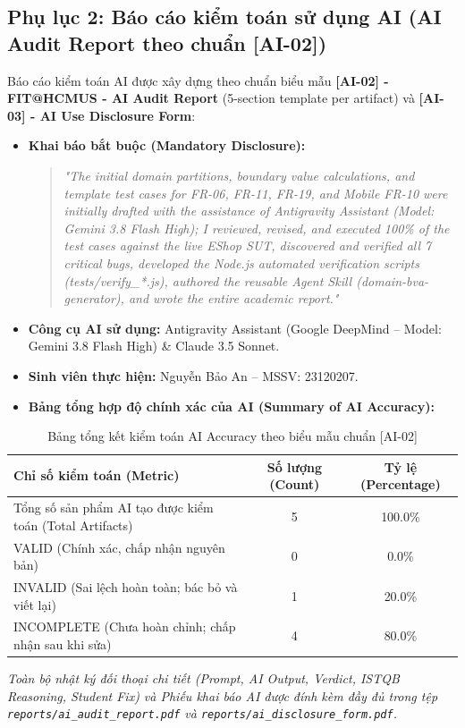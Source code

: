 \documentclass[11pt,a4paper]{article}
\begin{document}
\subsection{Phụ lục 2: Báo cáo kiểm toán sử dụng AI (AI Audit Report theo chuẩn [AI-02])}
Báo cáo kiểm toán AI được xây dựng theo chuẩn biểu mẫu \textbf{[AI-02] - FIT@HCMUS - AI Audit Report} (5-section template per artifact) và \textbf{[AI-03] - AI Use Disclosure Form}:

\begin{itemize}
    \item \textbf{Khai báo bắt buộc (Mandatory Disclosure):}
    \begin{quote}
    \textit{"The initial domain partitions, boundary value calculations, and template test cases for FR-06, FR-11, FR-19, and Mobile FR-10 were initially drafted with the assistance of Antigravity Assistant (Model: Gemini 3.8 Flash High); I reviewed, revised, and executed 100\% of the test cases against the live EShop SUT, discovered and verified all 7 critical bugs, developed the Node.js automated verification scripts (tests/verify\_*.js), authored the reusable Agent Skill (domain-bva-generator), and wrote the entire academic report."}
    \end{quote}
    \item \textbf{Công cụ AI sử dụng:} Antigravity Assistant (Google DeepMind -- Model: Gemini 3.8 Flash High) \& Claude 3.5 Sonnet.
    \item \textbf{Sinh viên thực hiện:} Nguyễn Bảo An -- MSSV: 23120207.
    \item \textbf{Bảng tổng hợp độ chính xác của AI (Summary of AI Accuracy):}
\end{itemize}

\begin{table}[h]
\centering
\small
\begin{tabularx}{0.85\textwidth}{X c c}
\toprule
\textbf{Chỉ số kiểm toán (Metric)} & \textbf{Số lượng (Count)} & \textbf{Tỷ lệ (Percentage)} \\
\midrule
Tổng số sản phẩm AI tạo được kiểm toán (Total Artifacts) & 5 & 100.0\% \\
VALID (Chính xác, chấp nhận nguyên bản) & 0 & 0.0\% \\
INVALID (Sai lệch hoàn toàn; bác bỏ và viết lại) & 1 & 20.0\% \\
INCOMPLETE (Chưa hoàn chỉnh; chấp nhận sau khi sửa) & 4 & 80.0\% \\
\bottomrule
\end{tabularx}
\caption{Bảng tổng kết kiểm toán AI Accuracy theo biểu mẫu chuẩn [AI-02]}
\end{table}

\noindent\textit{Toàn bộ nhật ký đối thoại chi tiết (Prompt, AI Output, Verdict, ISTQB Reasoning, Student Fix) và Phiếu khai báo AI được đính kèm đầy đủ trong tệp \texttt{reports/ai\_audit\_report.pdf} và \texttt{reports/ai\_disclosure\_form.pdf}.}
\end{document}

